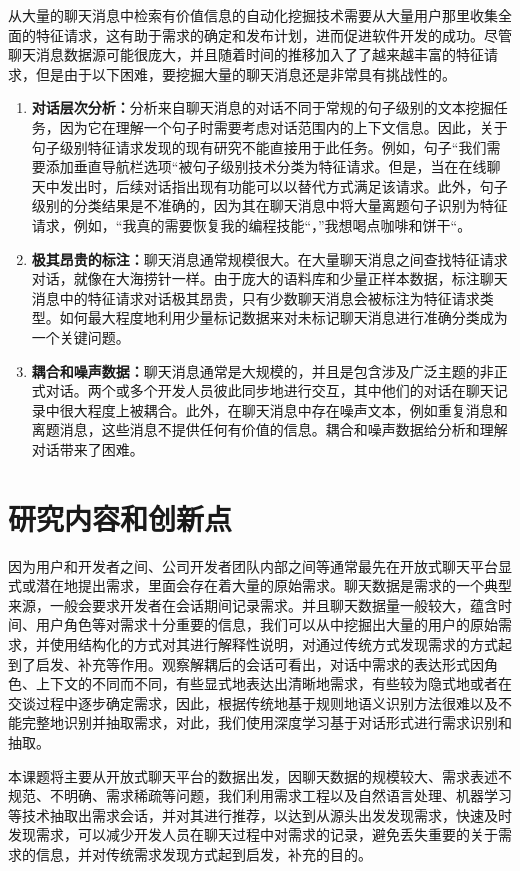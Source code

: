 从大量的聊天消息中检索有价值信息的自动化挖掘技术需要从大量用户那里收集全面的特征请求，这有助于需求的确定和发布计划，进而促进软件开发的成功。尽管聊天消息数据源可能很庞大，并且随着时间的推移加入了了越来越丰富的特征请求，但是由于以下困难，要挖掘大量的聊天消息还是非常具有挑战性的。
\begin{enumerate}
    \item \textbf{对话层次分析：}分析来自聊天消息的对话不同于常规的句子级别的文本挖掘任务，因为它在理解一个句子时需要考虑对话范围内的上下文信息。因此，关于句子级别特征请求发现的现有研究不能直接用于此任务。例如，句子“我们需要添加垂直导航栏选项“被句子级别技术分类为特征请求。但是，当在在线聊天中发出时，后续对话指出现有功能可以以替代方式满足该请求。此外，句子级别的分类结果是不准确的，因为其在聊天消息中将大量离题句子识别为特征请求，例如，“我真的需要恢复我的编程技能“，”我想喝点咖啡和饼干“。
    \item \textbf{极其昂贵的标注：}聊天消息通常规模很大。在大量聊天消息之间查找特征请求对话，就像在大海捞针一样。由于庞大的语料库和少量正样本数据，标注聊天消息中的特征请求对话极其昂贵，只有少数聊天消息会被标注为特征请求类型。如何最大程度地利用少量标记数据来对未标记聊天消息进行准确分类成为一个关键问题。
    \item \textbf{耦合和噪声数据：}聊天消息通常是大规模的，并且是包含涉及广泛主题的非正式对话。两个或多个开发人员彼此同步地进行交互，其中他们的对话在聊天记录中很大程度上被耦合。此外，在聊天消息中存在噪声文本，例如重复消息和离题消息，这些消息不提供任何有价值的信息。耦合和噪声数据给分析和理解对话带来了困难。
\end{enumerate}

\section{研究内容和创新点}

因为用户和开发者之间、公司开发者团队内部之间等通常最先在开放式聊天平台显式或潜在地提出需求，里面会存在着大量的原始需求。聊天数据是需求的一个典型来源，一般会要求开发者在会话期间记录需求。并且聊天数据量一般较大，蕴含时间、用户角色等对需求十分重要的信息，我们可以从中挖掘出大量的用户的原始需求，并使用结构化的方式对其进行解释性说明，对通过传统方式发现需求的方式起到了启发、补充等作用。观察解耦后的会话可看出，对话中需求的表达形式因角色、上下文的不同而不同，有些显式地表达出清晰地需求，有些较为隐式地或者在交谈过程中逐步确定需求，因此，根据传统地基于规则地语义识别方法很难以及不能完整地识别并抽取需求，对此，我们使用深度学习基于对话形式进行需求识别和抽取。


本课题将主要从开放式聊天平台的数据出发，因聊天数据的规模较大、需求表述不规范、不明确、需求稀疏等问题，我们利用需求工程以及自然语言处理、机器学习等技术抽取出需求会话，并对其进行推荐，以达到从源头出发发现需求，快速及时发现需求，可以减少开发人员在聊天过程中对需求的记录，避免丢失重要的关于需求的信息，并对传统需求发现方式起到启发，补充的目的。

